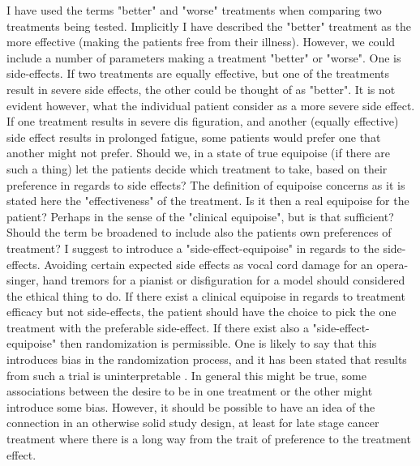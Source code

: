 \documentclass[12p]{article}
\begin{document}
I have used the terms "better" and "worse" treatments when comparing two treatments being tested.
Implicitly I have described the "better" treatment as the more effective (making the patients free from their illness).
However, we could include a number of parameters making a treatment "better" or "worse".
One is side-effects.
If two treatments are equally effective, but one of the treatments result in severe side effects, the other could be thought of as "better".
It is not evident however, what the individual patient consider as a more severe side effect.
If one treatment results in severe dis figuration, and another (equally effective) side effect results in prolonged fatigue, some patients would prefer one that another might not prefer.
Should we, in a state of true equipoise (if there are such a thing) let the patients decide which treatment to take, based on their preference in regards to side effects?
The definition of equipoise concerns as it is stated here the "effectiveness" of the treatment.
Is it then a real equipoise for the patient?
Perhaps in the sense of the "clinical equipoise", but is that sufficient?
Should the term be broadened to include also the patients own preferences of treatment?
I suggest to introduce a "side-effect-equipoise" in regards to the side-effects.
Avoiding certain expected side effects as vocal cord damage for an opera-singer, hand tremors for a pianist or disfiguration for a model should considered the ethical thing to do.
If there exist a clinical equipoise in regards to treatment efficacy but not side-effects, the patient should have the choice to pick the one treatment with the preferable side-effect.
If there exist also a "side-effect-equipoise" then randomization is permissible.
One is likely to say that this introduces bias in the randomization process, and it has been stated that results from such a trial is uninterpretable \cite{kadane}.
In general this might be true, some associations between the desire to be in one treatment or the other might introduce some bias.
However, it should be possible to have an idea of the connection in an otherwise solid study design, at least for late stage cancer treatment where there is a long way from the trait of preference to the treatment effect.


%
\end{document}

